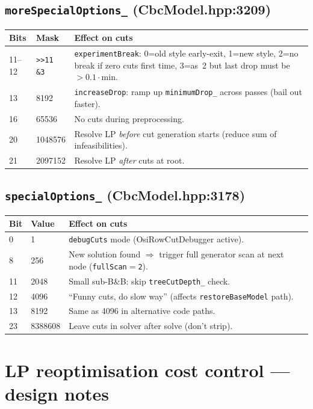 \documentclass[11pt,a4paper]{article}
\begin{document}
\subsection*{\texttt{moreSpecialOptions\_} (CbcModel.hpp:3209)}

\begin{longtable}{p{2.2cm}p{1.5cm}p{10cm}}
\toprule
\textbf{Bits} & \textbf{Mask} & \textbf{Effect on cuts}\\
\midrule
\endhead
11--12 & \texttt{>>11 \&3} & \texttt{experimentBreak}:
  0=old style early-exit, 1=new style, 2=no break if zero cuts
  first time, 3=as~2 but last drop must be $>0.1\cdot$min.\\
13 & 8192 & \texttt{increaseDrop}: ramp up
  \texttt{minimumDrop\_} across passes (bail out faster).\\
16 & 65536 & No cuts during preprocessing.\\
20 & 1048576 & Resolve LP \emph{before} cut generation starts
  (reduce sum of infeasibilities).\\
21 & 2097152 & Resolve LP \emph{after} cuts at root.\\
\bottomrule
\end{longtable}

\subsection*{\texttt{specialOptions\_} (CbcModel.hpp:3178)}

\begin{longtable}{p{2.2cm}p{1.8cm}p{9.7cm}}
\toprule
\textbf{Bit} & \textbf{Value} & \textbf{Effect on cuts}\\
\midrule
\endhead
0 & 1 & \texttt{debugCuts} mode (OsiRowCutDebugger active).\\
8 & 256 & New solution found $\Rightarrow$ trigger full generator
  scan at next node (\texttt{fullScan$=$2}).\\
11 & 2048 & Small sub-B\&B: skip \texttt{treeCutDepth\_} check.\\
12 & 4096 & ``Funny cuts, do slow way'' (affects
  \texttt{restoreBaseModel} path).\\
13 & 8192 & Same as 4096 in alternative code paths.\\
23 & 8388608 & Leave cuts in solver after solve (don't strip).\\
\bottomrule
\end{longtable}

\section{LP reoptimisation cost control --- design notes}
\label{sec:lpcost}
\end{document}
